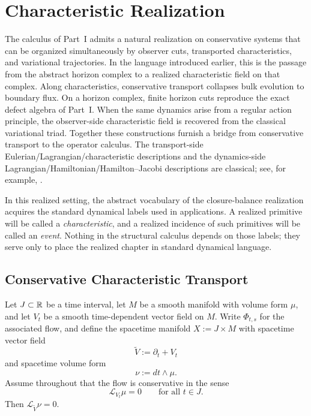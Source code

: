 \section{Characteristic Realization}
\label{sec:characteristic-realization}

The calculus of Part~I admits a natural realization on conservative systems
that can be organized simultaneously by observer cuts, transported
characteristics, and variational trajectories. In the language introduced
earlier, this is the passage from the abstract horizon complex to a realized
characteristic field on that complex. Along characteristics, conservative
transport collapses bulk evolution to boundary flux. On a horizon complex,
finite horizon cuts reproduce the exact defect algebra of Part~I. When the
same dynamics arise from a regular action principle, the observer-side
characteristic field is recovered from the classical variational triad.
Together these constructions furnish a bridge from conservative transport to
the operator calculus. The transport-side Eulerian/Lagrangian/characteristic
descriptions and the dynamics-side Lagrangian/Hamiltonian/Hamilton--Jacobi
descriptions are classical; see, for example,
\cite{Evans2010,Arnold1989}.

In this realized setting, the abstract vocabulary of the closure-balance
realization acquires the standard dynamical labels used in applications. A
realized primitive will be called a \emph{characteristic}, and a realized
incidence of such primitives will be called an \emph{event}. Nothing in the
structural calculus depends on those labels; they serve only to place the
realized chapter in standard dynamical language.

\subsection{Conservative Characteristic Transport}

Let $J \subset \mathbb{R}$ be a time interval, let $M$ be a smooth manifold with
volume form $\mu$, and let $V_t$ be a smooth time-dependent vector field on
$M$. Write $\Phi_{t,s}$ for the associated flow, and define the spacetime
manifold $X := J \times M$ with spacetime vector field
\[
\widetilde V := \partial_t + V_t
\]
and spacetime volume form
\[
\nu := dt \wedge \mu.
\]
Assume throughout that the flow is conservative in the sense
\[
\mathcal L_{V_t}\mu = 0 \qquad \text{for all } t \in J.
\]
Then $\mathcal L_{\widetilde V}\nu = 0$.

